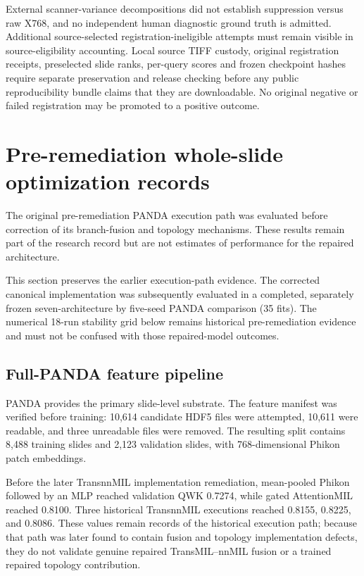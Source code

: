\documentclass[10pt]{article}
\begin{document}
External scanner-variance decompositions did not establish suppression versus raw X768, and no independent human diagnostic ground truth is admitted. Additional source-selected registration-ineligible attempts must remain visible in source-eligibility accounting. Local source TIFF custody, original registration receipts, preselected slide ranks, per-query scores and frozen checkpoint hashes require separate preservation and release checking before any public reproducibility bundle claims that they are downloadable. No original negative or failed registration may be promoted to a positive outcome.

\section{Pre-remediation whole-slide optimization records}
The original pre-remediation PANDA execution path was evaluated before correction of its branch-fusion and topology mechanisms. These results remain part of the research record but are not estimates of performance for the repaired architecture.

This section preserves the earlier execution-path evidence. The corrected canonical implementation was subsequently evaluated in a completed, separately frozen seven-architecture by five-seed PANDA comparison (35 fits). The numerical 18-run stability grid below remains historical pre-remediation evidence and must not be confused with those repaired-model outcomes.

\subsection{Full-PANDA feature pipeline}
PANDA provides the primary slide-level substrate. The feature manifest was verified before training: 10,614 candidate HDF5 files were attempted, 10,611 were readable, and three unreadable files were removed. The resulting split contains 8,488 training slides and 2,123 validation slides, with 768-dimensional Phikon patch embeddings.

Before the later TransnnMIL implementation remediation, mean-pooled Phikon followed by an MLP reached validation QWK 0.7274, while gated AttentionMIL reached 0.8100. Three historical TransnnMIL executions reached 0.8155, 0.8225, and 0.8086. These values remain records of the historical execution path; because that path was later found to contain fusion and topology implementation defects, they do not validate genuine repaired TransMIL--nnMIL fusion or a trained repaired topology contribution.
\end{document}
